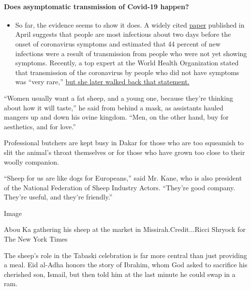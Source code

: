 \begin{itemize}
{  \paragraph{Does asymptomatic transmission of Covid-19
  happen?}\label{does-asymptomatic-transmission-of-covid-19-happen}}

  \begin{itemize}
  \tightlist
  \item
    So far, the evidence seems to show it does. A widely cited
    \href{https://www.nature.com/articles/s41591-020-0869-5}{paper}
    published in April suggests that people are most infectious about
    two days before the onset of coronavirus symptoms and estimated that
    44 percent of new infections were a result of transmission from
    people who were not yet showing symptoms. Recently, a top expert at
    the World Health Organization stated that transmission of the
    coronavirus by people who did not have symptoms was ``very rare,''
    \href{https://www.nytimes.com/2020/06/09/world/coronavirus-updates.html?action=click\&pgtype=Article\&state=default\&region=MAIN_CONTENT_3\&context=storylines_faq\#link-1f302e21}{but
    she later walked back that statement.}
  \end{itemize}
\end{itemize}

``Women usually want a fat sheep, and a young one, because they're
thinking about how it will taste,'' he said from behind a mask, as
assistants hauled mangers up and down his ovine kingdom. ``Men, on the
other hand, buy for aesthetics, and for love.''

Professional butchers are kept busy in Dakar for those who are too
squeamish to slit the animal's throat themselves or for those who have
grown too close to their woolly companion.

``Sheep for us are like dogs for Europeans,'' said Mr. Kane, who is also
president of the National Federation of Sheep Industry Actors. ``They're
good company. They're useful, and they're friendly.''

Image

Abou Ka gathering his sheep at the market in Missirah.Credit...Ricci
Shryock for The New York Times

The sheep's role in the Tabaski celebration is far more central than
just providing a meal. Eid al-Adha honors the story of Ibrahim, whom God
asked to sacrifice his cherished son, Ismail, but then told him at the
last minute he could swap in a ram.

